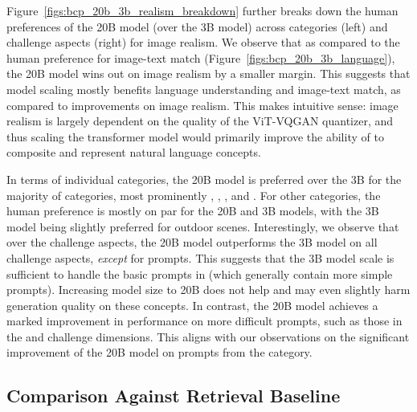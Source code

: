 Figure~\ref{figs:bcp_20b_3b_realism_breakdown} further breaks down the human preferences of the 20B model (over the 3B model) across \bcpa{} categories (left) and challenge aspects (right) for image realism. 
We observe that as compared to the human preference for image-text match (Figure~\ref{figs:bcp_20b_3b_language}), the 20B model wins out on image realism by a smaller margin. 
This suggests that model scaling mostly benefits language understanding and image-text match, as compared to improvements on image realism. This makes intuitive sense: image realism is largely dependent on the quality of the ViT-VQGAN quantizer, and thus scaling the transformer model would primarily improve the ability of \bdraw to composite and represent natural language concepts. 

In terms of individual categories, the 20B model is preferred over the 3B for the majority of categories, most prominently , , , and . For other categories, the human preference is mostly on par for the 20B and 3B models, with the 3B model being slightly preferred for outdoor scenes. Interestingly, we observe that over the challenge aspects, the 20B model outperforms the 3B model on all challenge aspects, \textit{except} for  prompts. This suggests that the 3B model scale is sufficient to handle the basic prompts in \bcp (which generally contain more simple prompts). Increasing model size to 20B does not help and may even slightly harm generation quality on these concepts. In contrast, the 20B model achieves a marked improvement in performance on more difficult \bcp prompts, such as those in the  and  challenge dimensions. This aligns with our observations on the significant improvement of the 20B model on prompts from the  category.


\subsection{Comparison Against Retrieval Baseline}

